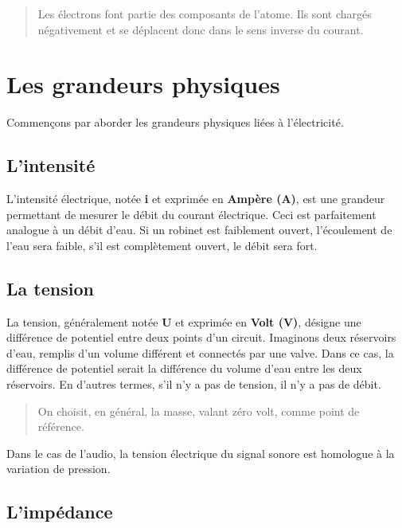 \documentclass[
]{book}
\begin{document}
\begin{quote}
Les électrons font partie des composants de l'atome. Ils sont chargés négativement et se déplacent donc dans le sens inverse du courant.
\end{quote}

\hypertarget{les-grandeurs-physiques}{%
\section{Les grandeurs physiques}\label{les-grandeurs-physiques}}

Commençons par aborder les grandeurs physiques liées à l'électricité.

\hypertarget{lintensituxe9}{%
\subsection{L'intensité}\label{lintensituxe9}}

L'intensité électrique, notée \textbf{i} et exprimée en \textbf{Ampère (A)}, est une grandeur permettant de mesurer le débit du courant électrique. Ceci est parfaitement analogue à un débit d'eau. Si un robinet est faiblement ouvert, l'écoulement de l'eau sera faible, s'il est complètement ouvert, le débit sera fort.

\hypertarget{la-tension}{%
\subsection{La tension}\label{la-tension}}

La tension, généralement notée \textbf{U} et exprimée en \textbf{Volt (V)}, désigne une différence de potentiel entre deux points d'un circuit. Imaginons deux réservoirs d'eau, remplis d'un volume différent et connectés par une valve. Dans ce cas, la différence de potentiel serait la différence du volume d'eau entre les deux réservoirs. En d'autres termes, s'il n'y a pas de tension, il n'y a pas de débit.

\begin{quote}
On choisit, en général, la masse, valant zéro volt, comme point de référence.
\end{quote}

Dans le cas de l'audio, la tension électrique du signal sonore est homologue à la variation de pression.

\hypertarget{limpuxe9dance}{%
\subsection{L'impédance}\label{limpuxe9dance}}
\end{document}
